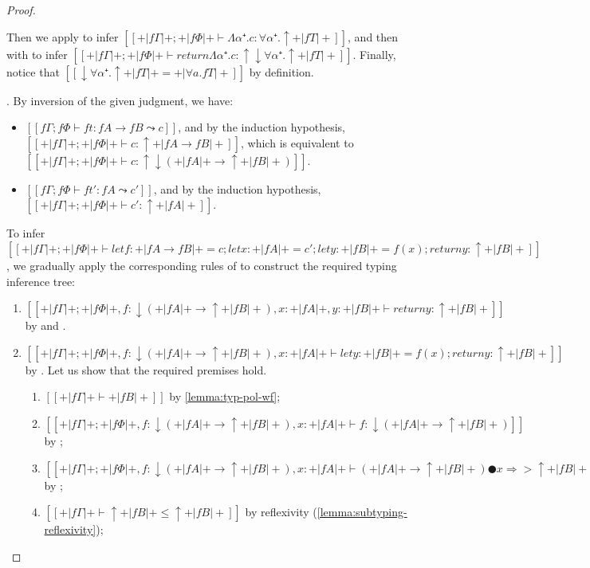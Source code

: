 \begin{proof}
\begin{caseof}
      Then we apply  to infer
      $[[+|fΓ|+ ; +|fΦ|+  ⊢ Λα⁺.c : ∀α⁺.↑+|fT|+]]$,
      and then 
       with
      to infer
      $[[+|fΓ|+ ; +|fΦ|+  ⊢ return {Λα⁺.c} : ↑↓∀α⁺.↑+|fT|+]]$.
      Finally, notice that $[[↓∀α⁺.↑+|fT|+ = +|∀a.fT|+]]$ by definition.

    \item {}.
      By inversion of the given judgment, we have:
      \begin{itemize}
        \item $[[fΓ ; fΦ ⊢ ft : fA → fB  ⤳  c]]$,
          and by the induction hypothesis,
          $[[+|fΓ|+ ; +|fΦ|+ ⊢ c : ↑+|fA → fB|+]]$,
          which is equivalent to
          $[[+|fΓ|+ ; +|fΦ|+ ⊢ c : ↑↓(+|fA|+ → ↑+|fB|+)]]$.
        \item $[[fΓ ; fΦ ⊢ ft' : fA  ⤳  c']]$, 
          and by the induction hypothesis,
          $[[+|fΓ|+ ; +|fΦ|+ ⊢ c' : ↑+|fA|+]]$.
      \end{itemize}
      To infer 
      $[[+|fΓ|+ ; +|fΦ|+ ⊢ let f : +|fA → fB|+ = c; let x : +|fA|+ = c'; let y:+|fB|+ = f(x); return y : ↑+|fB|+]]$, 
      we gradually apply the corresponding rules of \fexists to construct the required typing inference tree:
      \begin{enumerate}
        \item $[[+|fΓ|+ ; +|fΦ|+, f:↓(+|fA|+ → ↑+|fB|+), x:+|fA|+, y:+|fB|+ ⊢ return y : ↑+|fB|+]]$ by 
           and .  
        \item $[[+|fΓ|+ ; +|fΦ|+, f:↓(+|fA|+ → ↑+|fB|+), x:+|fA|+ ⊢ let y:+|fB|+ = f(x); return y : ↑+|fB|+]]$ by 
          . Let us show that the 
          required premises hold. 
          \begin{enumerate}
            \item $[[+|fΓ|+ ⊢ +|fB|+]]$ by \cref{lemma:typ-pol-wf};
            \item $[[+|fΓ|+ ; +|fΦ|+, f:↓(+|fA|+ → ↑+|fB|+), x:+|fA|+ ⊢ f : ↓(+|fA|+ → ↑+|fB|+)]]$ by 
              ;
            \item $[[+|fΓ|+ ; +|fΦ|+, f:↓(+|fA|+ → ↑+|fB|+), x:+|fA|+ ⊢ (+|fA|+ → ↑+|fB|+) ● x ⇒> ↑+|fB|+]]$
              by ;
            \item $[[+|fΓ|+ ⊢ ↑+|fB|+ ≤ ↑+|fB|+]]$ by reflexivity (\cref{lemma:subtyping-reflexivity});

\end{enumerate}
\end{enumerate}
\end{caseof}
\end{proof}
